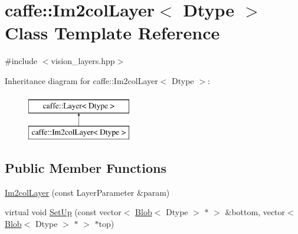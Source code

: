 \hypertarget{classcaffe_1_1_im2col_layer}{\section{caffe\+:\+:Im2col\+Layer$<$ Dtype $>$ Class Template Reference}
\label{classcaffe_1_1_im2col_layer}
}


{\ttfamily \#include $<$vision\+\_\+layers.\+hpp$>$}

Inheritance diagram for caffe\+:\+:Im2col\+Layer$<$ Dtype $>$\+:\begin{figure}[H]
\begin{center}
\leavevmode
\includegraphics[height=2.000000cm]{classcaffe_1_1_im2col_layer}
\end{center}
\end{figure}
\subsection*{Public Member Functions}
\begin{DoxyCompactItemize}
\item 
\hyperlink{classcaffe_1_1_im2col_layer_aec089ca3ca3caf3d32193b9dcb2f98e1}{Im2col\+Layer} (const Layer\+Parameter \&param)
\item 
virtual void \hyperlink{classcaffe_1_1_im2col_layer_a869008ef04af4d7aed3e412e449b1aeb}{Set\+Up} (const vector$<$ \hyperlink{classcaffe_1_1_blob}{Blob}$<$ Dtype $>$ $\ast$ $>$ \&bottom, vector$<$ \hyperlink{classcaffe_1_1_blob}{Blob}$<$ Dtype $>$ $\ast$ $>$ $\ast$top)
\end{DoxyCompactItemize}
